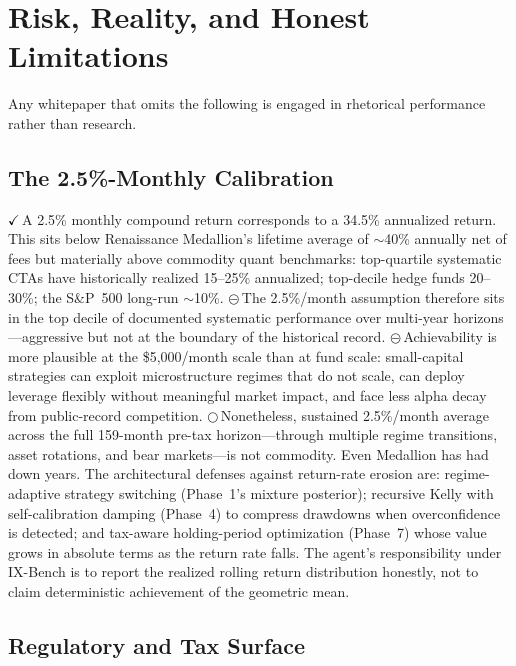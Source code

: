 \documentclass[conference,10pt,letterpaper]{IEEEtran}
\newcommand{\EV}{\textcolor{black}{\ensuremath{\checkmark}}\,}        %
\newcommand{\EP}{\textcolor{black}{\ensuremath{\circleddash}}\,}     %
\newcommand{\ES}{\textcolor{black}{\ensuremath{\bigcirc}}\,}         %
\begin{document}
\section{Risk, Reality, and Honest Limitations}

Any whitepaper that omits the following is engaged in rhetorical performance
rather than research.

\subsection{The 2.5\%-Monthly Calibration}

\EV{}A 2.5\% monthly compound return corresponds to a 34.5\%
annualized return. This sits below Renaissance Medallion's lifetime
average of $\sim$40\% annually net of fees but materially above
commodity quant benchmarks: top-quartile systematic CTAs have
historically realized 15--25\% annualized; top-decile hedge funds
20--30\%; the S\&P~500 long-run $\sim$10\%. \EP{}The 2.5\%/month
assumption therefore sits in the top decile of documented systematic
performance over multi-year horizons---aggressive but not at the
boundary of the historical record. \EP{}Achievability is more
plausible at the \$5{,}000/month scale than at fund scale: small-capital
strategies can exploit microstructure regimes that do not scale, can
deploy leverage flexibly without meaningful market impact, and face less
alpha decay from public-record competition. \ES{}Nonetheless, sustained
2.5\%/month average across the full 159-month pre-tax horizon---through
multiple regime transitions, asset rotations, and bear markets---is
not commodity. Even Medallion has had down years. The architectural
defenses against return-rate erosion are: regime-adaptive strategy
switching (Phase~1's mixture posterior); recursive Kelly with
self-calibration damping (Phase~4) to compress drawdowns when
overconfidence is detected; and tax-aware holding-period optimization
(Phase~7) whose value grows in absolute terms as the return rate falls.
The agent's responsibility under IX-Bench is to report the realized
rolling return distribution honestly, not to claim deterministic
achievement of the geometric mean.

\subsection{Regulatory and Tax Surface}
\end{document}
